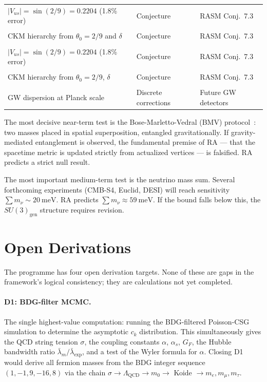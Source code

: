 \documentclass[11pt,a4paper]{article}
\begin{document}
\begin{table}[ht]
\begin{tabular}{p{5.2cm}p{4.5cm}p{3.5cm}}
$|V_{us}| = \sin(2/9) = 0.2204$ (1.8\% error) & Conjecture & RASM Conj.~7.3 \\\\
CKM hierarchy from $\theta_0 = 2/9$ and $\delta$ & Conjecture & RASM Conj.~7.3 \\\\
$|V_{us}| = \sin(2/9) = 0.2204$ (1.8\% error) & Conjecture & RASM Conj.~7.3 \\\\
CKM hierarchy from $\theta_0=2/9$, $\delta$ & Conjecture & RASM Conj.~7.3 \\\\
GW dispersion at Planck scale & Discrete corrections & Future GW detectors \\
\bottomrule
\end{tabular}
\end{table}

The most decisive near-term test is the Bose-Marletto-Vedral
(BMV) protocol~\citep{Bose2017, Marletto2017}: two masses placed in
spatial superposition, entangled gravitationally. If gravity-mediated
entanglement is observed, the fundamental premise of RA --- that the
spacetime metric is updated strictly from actualized vertices --- is
falsified. RA predicts a strict null result.

The most important medium-term test is the neutrino mass sum.
Several forthcoming experiments (CMB-S4, Euclid, DESI) will reach
sensitivity $\sum m_\nu \sim 20~\mathrm{meV}$. RA predicts
$\sum m_\nu \approx 59~\mathrm{meV}$. If the bound falls below
this, the $SU(3)_{\mathrm{gen}}$ structure requires revision.

\section{Open Derivations}
\label{sec:open}

The programme has four open derivation targets. None of these are gaps
in the framework's logical consistency; they are calculations not yet
completed.

\paragraph{D1: BDG-filter MCMC.}
The single highest-value computation: running the BDG-filtered
Poisson-CSG simulation to determine the asymptotic $c_k$
distribution. This simultaneously gives the QCD string tension
$\sigma$, the coupling constants $\alpha$, $\alpha_s$, $G_F$,
the Hubble bandwidth ratio $\bar\lambda_m/\bar\lambda_{\mathrm{exp}}$,
and a test of the Wyler formula for $\alpha$. Closing D1 would
derive all fermion masses from the BDG integer sequence
$(1,-1,9,-16,8)$ via the chain
$\sigma \to \Lambda_{\mathrm{QCD}} \to m_0 \to$ Koide $\to m_e, m_\mu, m_\tau$.
\end{document}
